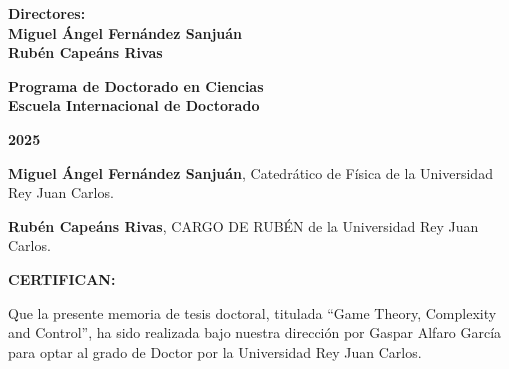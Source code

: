 \documentclass[a4paper,12pt]{newsiambook}
\newcommand{\clearemptydoublepage}{\newpage{\pagestyle{empty}\cleardoublepage}}
\begin{document}
\begin{center}
\vspace*{1cm}

\begin{center}
	{ \bf Directores: \\
		\vspace*{0.25cm}
		Miguel \'Angel Fern\'andez Sanju\'an\\
		\vspace*{0.25cm} 
		Rub\'en Cape\'ans Rivas}
\end{center}

\vspace*{1cm}

\begin{center}
	{\bf Programa de Doctorado en Ciencias\\
		Escuela Internacional de Doctorado }
\end{center} 

\vspace*{0.5cm}

\begin{center}
	{\bf \Large 2025}
\end{center}                         %

\end{center}

\clearemptydoublepage \frontmatter

\thispagestyle{empty}






\clearemptydoublepage


\noindent
\textbf{Miguel Ángel Fernández Sanjuán}, Catedrático de Física de la Universidad Rey Juan Carlos. 

\vspace*{0.5cm}

\noindent
\textbf{Rubén Capeáns Rivas}, CARGO DE RUBÉN de la Universidad Rey Juan Carlos.

\vspace*{1.5cm}

\textbf{CERTIFICAN:}

\vspace*{1.5cm}

Que la presente memoria de tesis doctoral, titulada “Game Theory, Complexity and Control”, ha sido realizada bajo nuestra dirección por Gaspar Alfaro García para optar al grado de Doctor por la Universidad Rey Juan Carlos. 
\end{document}
